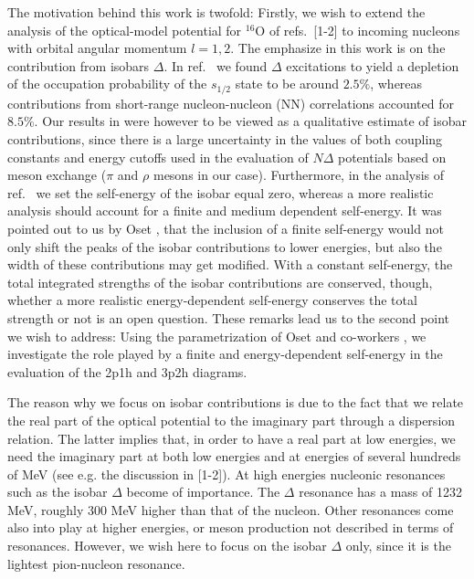 The motivation behind this work is twofold:\newline
Firstly, we wish to extend the analysis of the optical-model potential
for $^{16}$O of refs.\ [1-2]
to
incoming nucleons with orbital angular momentum $l=1,2$. The emphasize in
this work is on the contribution from isobars $\Delta$. 
In ref.\ \cite{hbmp93} we found $\Delta$ excitations to yield a
depletion of the occupation probability of the $s_{1/2}$ state to be around
$2.5\%$, whereas contributions from short-range nucleon-nucleon (NN) 
correlations accounted for $8.5\%$. Our results 
in \cite{hbmp93} were however to be viewed as a qualitative estimate of
isobar contributions, since there is a large uncertainty in the values
of both coupling constants and energy cutoffs used in the evaluation of
$N\Delta$ potentials based on meson exchange ($\pi$ and $\rho$ mesons
in our case). Furthermore, in the analysis of ref.\ \cite{hbmp93} we set
the self-energy of the isobar equal zero, whereas a more realistic 
analysis should account for a finite and medium dependent self-energy.
It was pointed out to us by Oset \cite{os93}, that
the inclusion of a finite self-energy would not only shift the peaks
of the isobar contributions to lower energies, but also the width of these
contributions may get modified. With a constant self-energy, the 
total integrated strengths of the isobar contributions are 
conserved, though, whether a more realistic energy-dependent self-energy
conserves
the total strength or not is an open question. 
These remarks lead us to the second point we wish to address:
Using the parametrization of Oset and co-workers \cite{os87,nieves93},
we investigate the role played by a finite and energy-dependent 
self-energy in the evaluation of the 2p1h and 3p2h diagrams. 

The reason why we focus on isobar contributions is due to the fact
that we relate the real part of the optical potential to the imaginary
part through a dispersion relation. The latter implies that, in order
to have a real part at low energies, we need the imaginary part at both 
low energies and at energies
of several hundreds of MeV (see e.g. the discussion in [1-2]). At high
energies  nucleonic resonances such as the isobar $\Delta$ become of
importance. The $\Delta$ resonance has a mass of 1232 MeV, roughly 300
MeV higher than that of the nucleon. Other resonances come also
into play at higher energies, or meson production not described in terms
of resonances. However, we wish here to focus on the isobar 
$\Delta$ only, since it is the lightest pion-nucleon resonance. 

